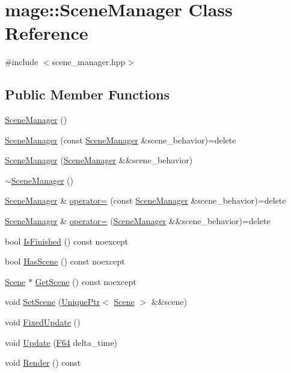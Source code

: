\hypertarget{classmage_1_1_scene_manager}{}\section{mage\+:\+:Scene\+Manager Class Reference}
\label{classmage_1_1_scene_manager}


{\ttfamily \#include $<$scene\+\_\+manager.\+hpp$>$}

\subsection*{Public Member Functions}
\begin{DoxyCompactItemize}
\item 
\hyperlink{classmage_1_1_scene_manager_a25a1185ca41db52d046a5901b301a0be}{Scene\+Manager} ()
\item 
\hyperlink{classmage_1_1_scene_manager_a450ce8e4d52483a2dcc3bb090f565373}{Scene\+Manager} (const \hyperlink{classmage_1_1_scene_manager}{Scene\+Manager} \&scene\+\_\+behavior)=delete
\item 
\hyperlink{classmage_1_1_scene_manager_ae8f4c6553e27b0bc00f0ea40f0e3770c}{Scene\+Manager} (\hyperlink{classmage_1_1_scene_manager}{Scene\+Manager} \&\&scene\+\_\+behavior)
\item 
\hyperlink{classmage_1_1_scene_manager_a849386b052d6ae8945c9554f888e1707}{$\sim$\+Scene\+Manager} ()
\item 
\hyperlink{classmage_1_1_scene_manager}{Scene\+Manager} \& \hyperlink{classmage_1_1_scene_manager_a90c17a35f737879fa07acb28f6d787af}{operator=} (const \hyperlink{classmage_1_1_scene_manager}{Scene\+Manager} \&scene\+\_\+behavior)=delete
\item 
\hyperlink{classmage_1_1_scene_manager}{Scene\+Manager} \& \hyperlink{classmage_1_1_scene_manager_a5f2e494edeb329e54a928a1bc0f5f7df}{operator=} (\hyperlink{classmage_1_1_scene_manager}{Scene\+Manager} \&\&scene\+\_\+behavior)=delete
\item 
bool \hyperlink{classmage_1_1_scene_manager_adeb1fd1d9f40229ccb0ef8adfb55f4cc}{Is\+Finished} () const noexcept
\item 
bool \hyperlink{classmage_1_1_scene_manager_ac767593112ea1d8b47cc79283cf7c47e}{Has\+Scene} () const noexcept
\item 
\hyperlink{classmage_1_1_scene}{Scene} $\ast$ \hyperlink{classmage_1_1_scene_manager_a55d720c9f90cfc46dbf07d46537072c1}{Get\+Scene} () const noexcept
\item 
void \hyperlink{classmage_1_1_scene_manager_abd9572b72caa412eda1f6c4e5d771fc3}{Set\+Scene} (\hyperlink{namespacemage_a3316d7143a973e37adf1110f2e80ca31}{Unique\+Ptr}$<$ \hyperlink{classmage_1_1_scene}{Scene} $>$ \&\&scene)
\item 
void \hyperlink{classmage_1_1_scene_manager_a6d97c0fb7945aeb53ec950e62567c1f4}{Fixed\+Update} ()
\item 
void \hyperlink{classmage_1_1_scene_manager_a10c718ddfca8caa4bdc6f1cbf1daf12f}{Update} (\hyperlink{namespacemage_ad26233bbec640deda836e572c1a23708}{F64} delta\+\_\+time)
\item 
void \hyperlink{classmage_1_1_scene_manager_a05c854e957e3f78e243efe3e422955a6}{Render} () const
\end{DoxyCompactItemize}
